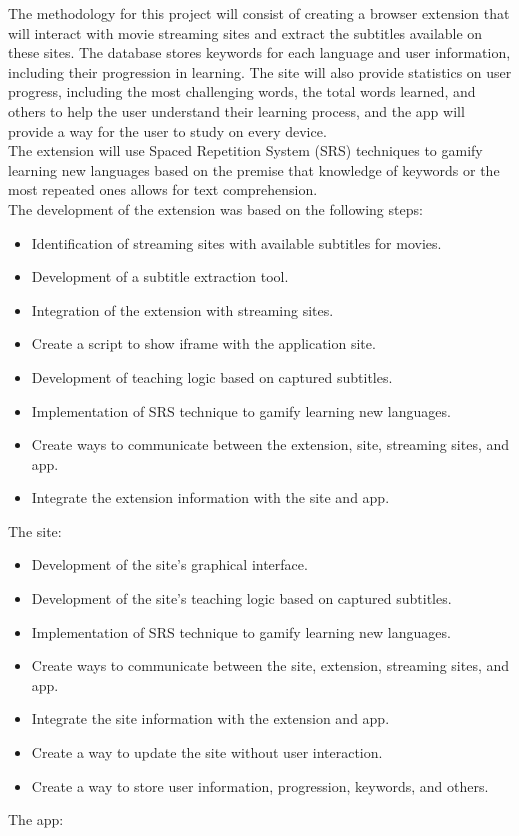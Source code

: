 \documentclass[12pt]{article}
\begin{document}
The methodology for this project will consist of creating a browser extension that will interact with movie streaming sites and extract the subtitles available on these sites. The database stores keywords for each language and user information, including their progression in learning. The site will also provide statistics on user progress, including the most challenging words, the total words learned, and others to help the user understand their learning process, and the app will provide a way for the user to study on every device. \\
The extension will use Spaced Repetition System (SRS) techniques to gamify learning new languages based on the premise that knowledge of keywords or the most repeated ones allows for text comprehension. \\
The development of the extension was based on the following steps:
\begin{itemize}
\item Identification of streaming sites with available subtitles for movies.
\item Development of a subtitle extraction tool.
\item Integration of the extension with streaming sites.
\item Create a script to show iframe with the application site.
\item Development of teaching logic based on captured subtitles.
\item Implementation of SRS technique to gamify learning new languages.
\item Create ways to communicate between the extension, site, streaming sites, and app.
\item Integrate the extension information with the site and app.
\end{itemize}
The site: 

\begin{itemize}
\item Development of the site's graphical interface.
\item Development of the site's teaching logic based on captured subtitles.
\item Implementation of SRS technique to gamify learning new languages.
\item Create ways to communicate between the site, extension, streaming sites, and app.
\item Integrate the site information with the extension and app.
\item Create a way to update the site without user interaction.
\item Create a way to store user information, progression, keywords, and others.
\end{itemize}
The app:
\end{document}
